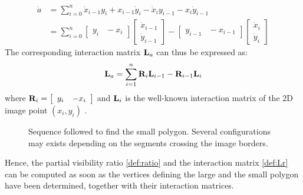 \documentclass[letterpaper, 10 pt, conference]{IEEEtran}  %
\begin{document}
\begin{align}
\dot a &= \sum_{i=0}^{n}{\dot x_{i-1} y_i + x_{i-1}\dot y_i -\dot x_i y_{i-1}} - x_i\dot y_{i-1} \\
& = \sum_{i=0}^{n}{
\left[\!\begin{array}{cc}y_i \!&\! -x_i\!\end{array}\!\right]
\left[\!\begin{array}{c}\dot x_{i-1} \\ \dot y_{i-1}\end{array}\!\right]
- \left[\!\begin{array}{cc}\!y_{i-1} \!&\! -x_{i-1}\!\end{array}\!\right]
\left[\!\begin{array}{c}\dot x_i \\ \dot y_i\end{array}\!\right]}
\end{align}
The corresponding interaction matrix $\mathbf{L}_a$ can thus be expressed as:
\begin{equation}\label{def:La}
\L_a = \sum_{i=1}^{n} \R_i\L_{i-1} - \R_{i-1}\L_i
\end{equation}where $\mathbf{R}_i = \left[\begin{array}{cc}y_i & -x_i\end{array}\right]$ and $\mathbf{L}_i$ is the well-known interaction matrix of the 2D image point $(x_i,y_i)$ \cite{2006_mra_chaumette}.

\begin{figure*}\centering
{}\hfil
{}\hfil
{}\hfil
{}
\caption{Sequence followed to find the small polygon. Several configurations may exists depending on the segments crossing the image borders.}
\label{fig:areas}
\end{figure*}

Hence, the partial visibility ratio \eqref{def:ratio} and the interaction matrix \eqref{def:Lr} can be computed as soon as 
the vertices defining the large and the small polygon have been determined, together with their interaction matrices.
\end{document}
